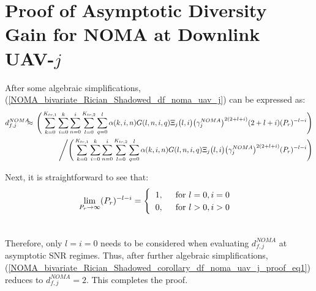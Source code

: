 \section{Proof of Asymptotic Diversity Gain for NOMA at Downlink UAV-$j$} \label{NOMA_bivariate_Rician_Shadowed_corollary_df_noma_uav_j_proof}
After some algebraic simplifications, (\ref{NOMA_bivariate_Rician_Shadowed_df_noma_uav_j}) can be expressed as:
\begin{eqnarray}
d_{f,j}^{NOMA} & \hspace{-0.2cm} \approx & \hspace{-0.2cm} \Bigg(\sum_{k=0}^{K_{tr,1}} \sum_{i=0}^{k} \sum_{n=0}^{i} \sum_{l=0}^{K_{tr,2}} \sum_{q=0}^{l} \alpha(k,i,n) G(l,n,i,q) \Xi_j\big(l,i\big) \big(\gamma_j^{NOMA}\big)^{2(2+l+i)} (2+l+i) (P_r)^{-l-i} \Bigg) \nonumber \\
 & & \Bigg/ \Bigg( \sum_{k=0}^{K_{tr,1}} \sum_{i=0}^{k} \sum_{n=0}^{i} \sum_{l=0}^{K_{tr,2}} \sum_{q=0}^{l} \alpha(k,i,n) G(l,n,i,q) \Xi_j\big(l,i\big) \big(\gamma_j^{NOMA}\big)^{2(2+l+i)} (P_r)^{-l-i} \Bigg) \label{NOMA_bivariate_Rician_Shadowed_corollary_df_noma_uav_j_proof_eq1}
\end{eqnarray}

Next, it is straightforward to see that:
\begin{eqnarray}
 \lim_{P_r \to \infty} (P_r)^{-l-i} \hspace{0cm} = \hspace{0cm} \begin{cases}
    \hspace{0.2cm} 1, \hspace{0.5cm} \text{for } l=0, i=0\\
    \hspace{0.2cm} 0, \hspace{0.5cm} \text{for } l>0, i>0\\ 
  \end{cases} \\\nonumber
\end{eqnarray}

Therefore, only $l=i=0$ needs to be considered when evaluating $d_{f,j}^{NOMA}$ at asymptotic SNR regimes. Thus, after further algebraic simplifications, (\ref{NOMA_bivariate_Rician_Shadowed_corollary_df_noma_uav_j_proof_eq1}) reduces to $d_{f,j}^{NOMA} = 2$. This completes the proof.



